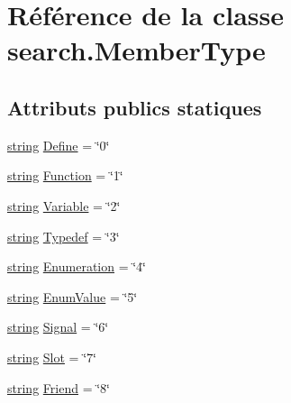 \hypertarget{classsearch_1_1_member_type}{}\section{Référence de la classe search.\+Member\+Type}
\label{classsearch_1_1_member_type}
\subsection*{Attributs publics statiques}
\begin{DoxyCompactItemize}
\item 
\hyperlink{tclscanner_8cpp_a3b18665bed369c4cf583afc1b05f583a}{string} \hyperlink{classsearch_1_1_member_type_aa908a50d2f305c3e16c6a4213fe9dfc2}{Define} = \char`\"{}0\char`\"{}
\item 
\hyperlink{tclscanner_8cpp_a3b18665bed369c4cf583afc1b05f583a}{string} \hyperlink{classsearch_1_1_member_type_afd4c12694259e08f7ee33caa6b8f9d00}{Function} = \char`\"{}1\char`\"{}
\item 
\hyperlink{tclscanner_8cpp_a3b18665bed369c4cf583afc1b05f583a}{string} \hyperlink{classsearch_1_1_member_type_a1e9433d973bbf07cfc858ed42ad52bd8}{Variable} = \char`\"{}2\char`\"{}
\item 
\hyperlink{tclscanner_8cpp_a3b18665bed369c4cf583afc1b05f583a}{string} \hyperlink{classsearch_1_1_member_type_a59b1f547a2eb59d07b2cc49c495b4480}{Typedef} = \char`\"{}3\char`\"{}
\item 
\hyperlink{tclscanner_8cpp_a3b18665bed369c4cf583afc1b05f583a}{string} \hyperlink{classsearch_1_1_member_type_ac21b740670962db652154a4e4852db7a}{Enumeration} = \char`\"{}4\char`\"{}
\item 
\hyperlink{tclscanner_8cpp_a3b18665bed369c4cf583afc1b05f583a}{string} \hyperlink{classsearch_1_1_member_type_a3c01f493d3472fbe18f9271dbb0260cf}{Enum\+Value} = \char`\"{}5\char`\"{}
\item 
\hyperlink{tclscanner_8cpp_a3b18665bed369c4cf583afc1b05f583a}{string} \hyperlink{classsearch_1_1_member_type_afb8879a499419119f69fda5eb967bd12}{Signal} = \char`\"{}6\char`\"{}
\item 
\hyperlink{tclscanner_8cpp_a3b18665bed369c4cf583afc1b05f583a}{string} \hyperlink{classsearch_1_1_member_type_ab7f9da8a73b9e4cd90f07cd7f3eb8d8c}{Slot} = \char`\"{}7\char`\"{}
\item 
\hyperlink{tclscanner_8cpp_a3b18665bed369c4cf583afc1b05f583a}{string} \hyperlink{classsearch_1_1_member_type_aec9abea23bf1bd93c3df27cfb048635c}{Friend} = \char`\"{}8\char`\"{}

\end{DoxyCompactItemize}
